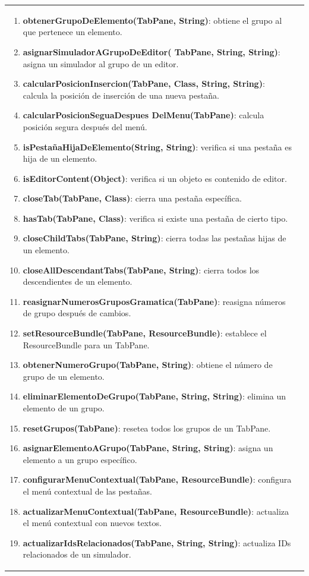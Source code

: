 \begin{longtable}[H]{|>{\columncolor[rgb]{0.63,0.79,0.95}}m{6cm} | m{8.5cm} |}
\begin{enumerate}
    \item \textbf{obtenerGrupoDeElemento(TabPane, String)}: obtiene el grupo al que pertenece un elemento.
    \item \textbf{asignarSimuladorAGrupoDeEditor( TabPane, String, String)}: asigna un simulador al grupo de un editor.
    \item \textbf{calcularPosicionInsercion(TabPane, Class, String, String)}: calcula la posición de inserción de una nueva pestaña.
    \item \textbf{calcularPosicionSeguaDespues DelMenu(TabPane)}: calcula posición segura después del menú.
    \item \textbf{isPestañaHijaDeElemento(String, String)}: verifica si una pestaña es hija de un elemento.
    \item \textbf{isEditorContent(Object)}: verifica si un objeto es contenido de editor.
    \item \textbf{closeTab(TabPane, Class)}: cierra una pestaña específica.
    \item \textbf{hasTab(TabPane, Class)}: verifica si existe una pestaña de cierto tipo.
    \item \textbf{closeChildTabs(TabPane, String)}: cierra todas las pestañas hijas de un elemento.
    \item \textbf{closeAllDescendantTabs(TabPane, String)}: cierra todos los descendientes de un elemento.
    \item \textbf{reasignarNumerosGruposGramatica(TabPane)}: reasigna números de grupo después de cambios.
    \item \textbf{setResourceBundle(TabPane, ResourceBundle)}: establece el ResourceBundle para un TabPane.
    \item \textbf{obtenerNumeroGrupo(TabPane, String)}: obtiene el número de grupo de un elemento.
    \item \textbf{eliminarElementoDeGrupo(TabPane, String, String)}: elimina un elemento de un grupo.
    \item \textbf{resetGrupos(TabPane)}: resetea todos los grupos de un TabPane.
    \item \textbf{asignarElementoAGrupo(TabPane, String, String)}: asigna un elemento a un grupo específico.
    \item \textbf{configurarMenuContextual(TabPane, ResourceBundle)}: configura el menú contextual de las pestañas.
    \item \textbf{actualizarMenuContextual(TabPane, ResourceBundle)}: actualiza el menú contextual con nuevos textos.
    \item \textbf{actualizarIdsRelacionados(TabPane, String, String)}: actualiza IDs relacionados de un simulador.

\end{enumerate}
\end{longtable}

